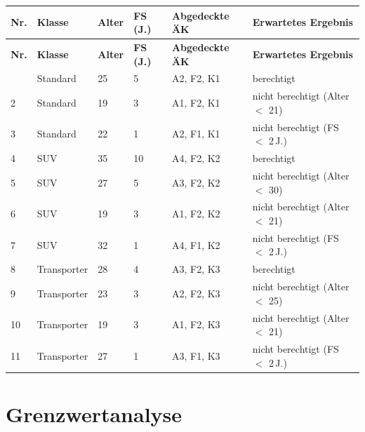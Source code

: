 \documentclass[
	fontsize=12pt,          %
	paper=a4,               %
	numbers=noenddot,       %
	listof=totoc,           %
	listof=entryprefix,     %
	listof=nochaptergap,    %
	bibliography=totoc,     %
	parskip=half,           %
	openany                 %
]{scrbook}
\begin{document}
\begin{longtable}{| p{0.5cm} | p{2.0cm} | p{1.2cm} | p{1.5cm} | p{2.8cm} | p{4.5cm} |}
	\hline
	\textbf{Nr.} & \textbf{Klasse} & \textbf{Alter} & \textbf{FS (J.)} & \textbf{Abgedeckte ÄK} & \textbf{Erwartetes Ergebnis} \\ \hline
	\endfirsthead
	\hline
	\textbf{Nr.} & \textbf{Klasse} & \textbf{Alter} & \textbf{FS (J.)} & \textbf{Abgedeckte ÄK} & \textbf{Erwartetes Ergebnis} \\ \hline
	\endhead
	\hline
	\endfoot
	1 & Standard & 25 & 5 & A2, F2, K1 & berechtigt \\ \hline
	2 & Standard & 19 & 3 & A1, F2, K1 & nicht berechtigt (Alter $<$ 21) \\ \hline
	3 & Standard & 22 & 1 & A2, F1, K1 & nicht berechtigt (FS $<$ 2\,J.) \\ \hline
	4 & SUV & 35 & 10 & A4, F2, K2 & berechtigt \\ \hline
	5 & SUV & 27 & 5 & A3, F2, K2 & nicht berechtigt (Alter $<$ 30) \\ \hline
	6 & SUV & 19 & 3 & A1, F2, K2 & nicht berechtigt (Alter $<$ 21) \\ \hline
	7 & SUV & 32 & 1 & A4, F1, K2 & nicht berechtigt (FS $<$ 2\,J.) \\ \hline
	8 & Transporter & 28 & 4 & A3, F2, K3 & berechtigt \\ \hline
	9 & Transporter & 23 & 3 & A2, F2, K3 & nicht berechtigt (Alter $<$ 25) \\ \hline
	10 & Transporter & 19 & 3 & A1, F2, K3 & nicht berechtigt (Alter $<$ 21) \\ \hline
	11 & Transporter & 27 & 1 & A3, F1, K3 & nicht berechtigt (FS $<$ 2\,J.) \\ \hline
\end{longtable}

\section*{Grenzwertanalyse}
\end{document}
